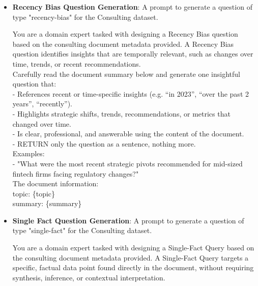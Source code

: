 \documentclass[12pt,twoside]{report}
\begin{document}
\begin{itemize}
\begin{colquote}
    RETURN FORMAT (and nothing else): \\
    \{ \\
        topic: "str" \\
        summary: "str" \\
    \}
    \end{colquote}

    \item \textbf{Recency Bias Question Generation}: A prompt to generate a question of type "recency-bias" for the Consulting dataset.
    \begin{colquote}
    You are a domain expert tasked with designing a Recency Bias question based on the consulting document metadata provided. A Recency Bias question identifies insights that are temporally relevant, such as changes over time, trends, or recent recommendations. \\

    Carefully read the document summary below and generate one insightful question that: \\
    - References recent or time-specific insights (e.g. “in 2023”, “over the past 2 years”, “recently”). \\
    - Highlights strategic shifts, trends, recommendations, or metrics that changed over time. \\
    - Is clear, professional, and answerable using the content of the document. \\
    - RETURN only the question as a sentence, nothing more. \\

    Examples: \\
    - "What were the most recent strategic pivots recommended for mid-sized fintech firms facing regulatory changes?" \\

    The document information: \\
    topic: \{topic\} \\
    summary: \{summary\} \\
    \end{colquote}

    \item \textbf{Single Fact Question Generation}: A prompt to generate a question of type "single-fact" for the Consulting dataset.
    \begin{colquote}
    You are a domain expert tasked with designing a Single-Fact Query based on the consulting document metadata provided. A Single-Fact Query targets a specific, factual data point found directly in the document, without requiring synthesis, inference, or contextual interpretation. \\


\end{colquote}
\end{itemize}
\end{document}
